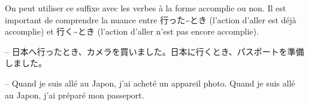         On peut utiliser ce suffixe avec les verbes à la forme accomplie ou non. Il est important de comprendre la nuance entre 行った\~{}とき (l’action d’aller est déjà accomplie) et 行く\~{}とき (l’action d’aller n’est pas encore accomplie).

        \begin{tcolorbox}
            -- 日本へ行ったとき、カメラを買いました。日本に行くとき、パスポートを準備しました。

            -- Quand je suis allé au Japon, j'ai acheté un appareil photo. Quand je suis allé au Japon, j’ai préparé mon passeport.
        \end{tcolorbox}
    
